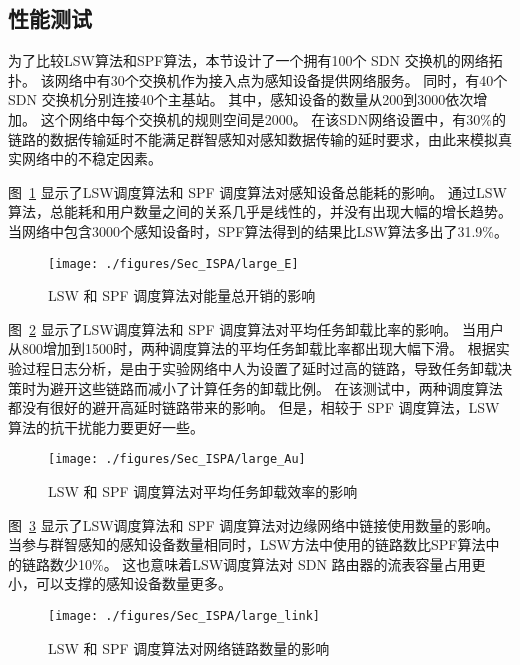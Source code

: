 \subsection{性能测试}

为了比较LSW算法和SPF算法，本节设计了一个拥有100个 SDN 交换机的网络拓扑。
该网络中有30个交换机作为接入点为感知设备提供网络服务。
同时，有40个 SDN 交换机分别连接40个主基站。
其中，感知设备的数量从200到3000依次增加。
这个网络中每个交换机的规则空间是2000。
在该SDN网络设置中，有30\%的链路的数据传输延时不能满足群智感知对感知数据传输的延时要求，由此来模拟真实网络中的不稳定因素。

图~\ref{fig_largeE} 显示了LSW调度算法和 SPF 调度算法对感知设备总能耗的影响。
通过LSW算法，总能耗和用户数量之间的关系几乎是线性的，并没有出现大幅的增长趋势。
当网络中包含3000个感知设备时，SPF算法得到的结果比LSW算法多出了31.9\%。

\begin{figure}[!h]
  \centering
  \texttt{[image: ./figures/Sec\_ISPA/large\_E]}
  \vspace{-0.5em}
  \caption{ LSW 和 SPF 调度算法对能量总开销的影响}
  \label{fig_largeE}
  \vspace{-1em}
\end{figure}

图~\ref{fig_largeAu} 显示了LSW调度算法和 SPF 调度算法对平均任务卸载比率的影响。
当用户从800增加到1500时，两种调度算法的平均任务卸载比率都出现大幅下滑。
根据实验过程日志分析，是由于实验网络中人为设置了延时过高的链路，导致任务卸载决策时为避开这些链路而减小了计算任务的卸载比例。
在该测试中，两种调度算法都没有很好的避开高延时链路带来的影响。
但是，相较于 SPF 调度算法，LSW算法的抗干扰能力要更好一些。

\begin{figure}[!h]
  \centering
  \texttt{[image: ./figures/Sec\_ISPA/large\_Au]}
  \vspace{-0.5em}
  \caption{LSW 和 SPF 调度算法对平均任务卸载效率的影响}
  \vspace{-1em}
  \label{fig_largeAu}
\end{figure}

图~\ref{fig_largeL} 显示了LSW调度算法和 SPF 调度算法对边缘网络中链接使用数量的影响。当参与群智感知的感知设备数量相同时，LSW方法中使用的链路数比SPF算法中的链路数少10\%。
这也意味着LSW调度算法对 SDN 路由器的流表容量占用更小，可以支撑的感知设备数量更多。

\begin{figure}[!h]
  \centering
  \texttt{[image: ./figures/Sec\_ISPA/large\_link]}
  \vspace{-0.5em}
  \caption{LSW 和 SPF 调度算法对网络链路数量的影响}
  \vspace{-1em}
  \label{fig_largeL}
\end{figure}

